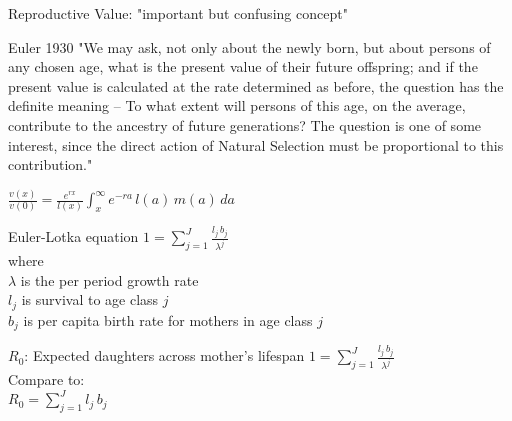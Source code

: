 \documentclass{beamer}
\begin{document}
\begin{frame}{Reproductive Value: "important but confusing concept"}
\begin{block}{Euler 1930}
"We may ask, not only about the newly born, but about persons of any chosen age, what is the present value of their future offspring; and if the present value is calculated at the rate determined as before, the question has the definite meaning -- To what extent will persons of this age, on the average, contribute to the ancestry of future generations? The question is one of some interest, since the direct action of Natural Selection must be proportional to this contribution."
\end{block}
\vspace{.5cm}
\pause
$\frac{v(x)}{v(0)} = \frac{e^{rx}}{l(x)} \int_{x}^{\infty} e^{-ra} \, l(a) \, m(a) \, da$
\end{frame}

\begin{frame}{Euler-Lotka equation}
$1 = \displaystyle\sum\limits_{j=1}^{J} \frac{l_j \, b_j}{\lambda^j}$\\
\vspace{.5cm}
where\\
\vspace{.5cm}
$\lambda$ is the per period growth rate\\
\vspace{.5cm}
$l_j$ is survival to age class $j$\\
\vspace{.5cm}
$b_j$ is per capita birth rate for mothers in age class $j$\\
\end{frame}

\begin{frame}{$R_0$: Expected daughters across mother's lifespan}
$1 = \displaystyle\sum\limits_{j=1}^{J} \frac{l_j \, b_j}{\lambda^j}$\\
\vspace{.5cm}
Compare to:\\
\vspace{.5cm}
$R_0 = \displaystyle\sum\limits_{j=1}^{J} l_j \, b_j$\\
\end{frame}
\end{document}
